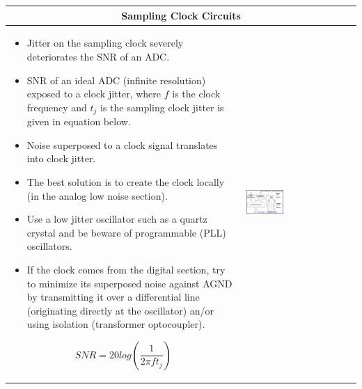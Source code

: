 				\begin{table}[h!]
				\centering
				\begin{tabular}{|m{}|m{}|}

						\multicolumn{2}{c}{\textbf{Sampling Clock Circuits}}
					\\
					\hline
						\begin{itemize}
							\item Jitter on the sampling clock severely deteriorates the SNR of an ADC. 
							\item SNR of an ideal ADC (infinite resolution) exposed to a clock jitter, where $f$ is the clock frequency and $t_j$ is the sampling clock jitter is given in equation below. 
							\item Noise superposed to a clock signal translates into clock jitter. 
							\item The best solution is to create the clock locally (in the analog low noise section). 
							\item Use a low jitter oscillator such as a quartz crystal and be beware of programmable (PLL) oscillators. 
							\item If the clock comes from the digital section, try to minimize its superposed noise against AGND by transmitting it over a differential line (originating directly at the oscillator) an/or using isolation (transformer optocoupler). 
						\end{itemize}
						\begin{equation}
							SNR = 20log\left(\frac{1}{2\pi f t_j}\right)
						\end{equation}
					& 
						 \begin{center}\includegraphics[width=0.35\textwidth]{images/Clock.png}\end{center}  
					\\	
					\hline
					\end{tabular}
				\end{table}	
			

